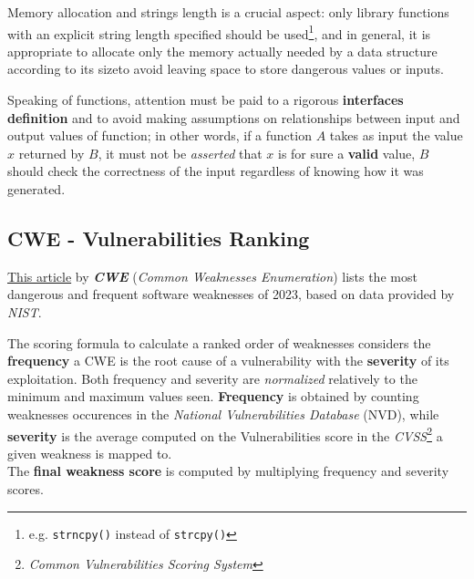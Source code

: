 Memory allocation and strings length is a crucial aspect:
only library functions with an explicit string length specified should be used\footnote{e.g. \lstinline|strncpy()| instead of \lstinline|strcpy()|},
and in general,
it is appropriate to
allocate only the memory actually needed by a data structure according to its sizeto avoid leaving
space to store dangerous values or inputs.\nl

Speaking of functions,
attention must be paid to a rigorous \textbf{interfaces definition} and to avoid making assumptions on relationships between input and output values of function;
in other words, if a function $A$ takes as input the value $x$ returned by $B$,
it must not be \textit{asserted} that $x$ is for sure a \textbf{valid} value,
$B$ should check the correctness of the input regardless of knowing how it was generated.

\subsection{CWE - Vulnerabilities Ranking}
\href{https://cwe.mitre.org/top25/archive/2023/2023_top25_list.html#tableView}{This article} by \textit{\textbf{CWE}} (\textit{Common Weaknesses Enumeration}) lists the most dangerous and frequent software weaknesses of 2023,
based on data provided by \textit{NIST}.

The scoring formula to calculate a ranked order of weaknesses
considers the \textbf{frequency} a CWE is the root cause of a vulnerability
with the \textbf{severity} of its exploitation. Both frequency and severity are
\textit{normalized} relatively to the minimum and maximum values seen.
\textbf{Frequency} is obtained by counting weaknesses occurences in the \textit{National Vulnerabilities Database} (NVD),
while \textbf{severity} is the average computed on the Vulnerabilities score in the \textit{CVSS}\footnote{\textit{Common Vulnerabilities Scoring System}} a given weakness is mapped to.\\
The \textbf{final weakness score} is computed by multiplying frequency and severity scores.

